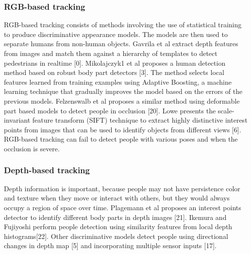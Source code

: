 \documentclass[paper=a4, fontsize=11pt]{scrartcl}
\numberwithin{equation}{section}		%
\numberwithin{figure}{section}			%
\numberwithin{table}{section}				%
\begin{document}
\subsubsection{RGB-based tracking}

RGB-based tracking consists of methods involving the use of statistical training to produce discriminative appearance models. The models are then used to separate humans from non-human objects. Gavrila et al extract depth features from images and match them against a hierarchy of templates to detect pedestrians in realtime [0]. Mikolajczyk1 et al proposes a human detection method based on robust body part detectors [3]. The method selects local features learned from training examples using Adaptive Boosting, a machine learning technique that gradually improves the model based on the errors of the previous models. Felzenswalb et al proposes a similar method using deformable part based models to detect people in occlusion [20]. Lowe presents the scale-invariant feature transform (SIFT) technique to extract highly distinctive interest points from images that can be used to identify objects from different views [6]. RGB-based tracking can fail to detect people with various poses and when the occlusion is severe.

\subsubsection{Depth-based tracking}

Depth information is important, because people may not have persistence color and texture when they move or interact with others, but they would always occupy a region of space over time. Plagemann et al proposes an interest points detector to identify different body parts in depth images [21]. Ikemura and Fujiyoshi perform people detection using similarity features from local depth histograms[22]. Other discriminative models detect people using directional changes in depth map [5] and incorporating multiple sensor inputs [17].
\end{document}
